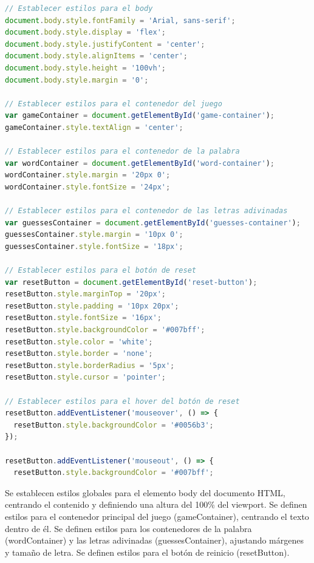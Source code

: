 \begin{lstlisting}[language=JavaScript]
// Establecer estilos para el body
document.body.style.fontFamily = 'Arial, sans-serif';
document.body.style.display = 'flex';
document.body.style.justifyContent = 'center';
document.body.style.alignItems = 'center';
document.body.style.height = '100vh';
document.body.style.margin = '0';

// Establecer estilos para el contenedor del juego
var gameContainer = document.getElementById('game-container');
gameContainer.style.textAlign = 'center';

// Establecer estilos para el contenedor de la palabra
var wordContainer = document.getElementById('word-container');
wordContainer.style.margin = '20px 0';
wordContainer.style.fontSize = '24px';

// Establecer estilos para el contenedor de las letras adivinadas
var guessesContainer = document.getElementById('guesses-container');
guessesContainer.style.margin = '10px 0';
guessesContainer.style.fontSize = '18px';

// Establecer estilos para el botón de reset
var resetButton = document.getElementById('reset-button');
resetButton.style.marginTop = '20px';
resetButton.style.padding = '10px 20px';
resetButton.style.fontSize = '16px';
resetButton.style.backgroundColor = '#007bff';
resetButton.style.color = 'white';
resetButton.style.border = 'none';
resetButton.style.borderRadius = '5px';
resetButton.style.cursor = 'pointer';

// Establecer estilos para el hover del botón de reset
resetButton.addEventListener('mouseover', () => {
  resetButton.style.backgroundColor = '#0056b3';
});

resetButton.addEventListener('mouseout', () => {
  resetButton.style.backgroundColor = '#007bff';
\end{lstlisting}
Se establecen estilos globales para el elemento body del documento HTML, centrando el contenido y definiendo una altura del 100\% del viewport. Se definen estilos para el contenedor principal del juego (gameContainer), centrando el texto dentro de él. Se definen estilos para los contenedores de la palabra (wordContainer) y las letras adivinadas (guessesContainer), ajustando márgenes y tamaño de letra. Se definen estilos para el botón de reinicio (resetButton).
